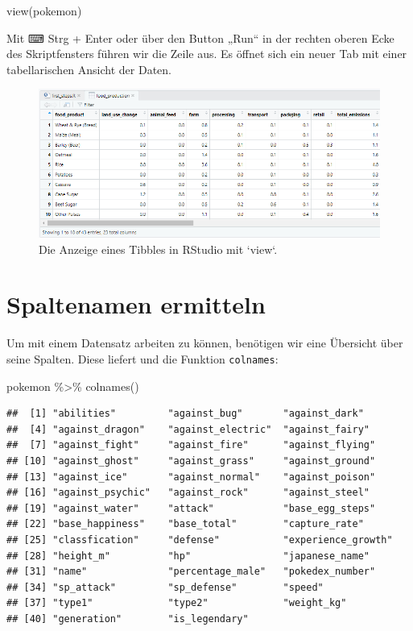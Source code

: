 \documentclass[
]{book}
\newenvironment{Shaded}{\begin{snugshade}}{\end{snugshade}}
\newcommand{\FunctionTok}[1]{\textcolor[rgb]{0.00,0.00,0.00}{#1}}
\newcommand{\NormalTok}[1]{#1}
\newcommand{\SpecialCharTok}[1]{\textcolor[rgb]{0.00,0.00,0.00}{#1}}
\begin{document}
\begin{Shaded}
\begin{Highlighting}[]
\FunctionTok{view}\NormalTok{(pokemon)}
\end{Highlighting}
\end{Shaded}

Mit ⌨ Strg + Enter oder über den Button „Run`` in der rechten oberen Ecke des Skriptfensters führen wir die Zeile aus. Es öffnet sich ein neuer Tab mit einer tabellarischen Ansicht der Daten.

\begin{figure}
\includegraphics[width=1\linewidth]{fig/view_result_rstudio} \caption{Die Anzeige eines Tibbles in RStudio mit `view`.}\label{fig:fig-view-rstudio}
\end{figure}

\hypertarget{spaltennamen-ermitteln}{%
\section{Spaltenamen ermitteln}\label{spaltennamen-ermitteln}}

Um mit einem Datensatz arbeiten zu können, benötigen wir eine Übersicht über seine Spalten. Diese liefert und die Funktion \texttt{colnames}:

\begin{Shaded}
\begin{Highlighting}[]
\NormalTok{pokemon }\SpecialCharTok{\%\textgreater{}\%}
  \FunctionTok{colnames}\NormalTok{()}
\end{Highlighting}
\end{Shaded}

\begin{verbatim}
##  [1] "abilities"         "against_bug"       "against_dark"     
##  [4] "against_dragon"    "against_electric"  "against_fairy"    
##  [7] "against_fight"     "against_fire"      "against_flying"   
## [10] "against_ghost"     "against_grass"     "against_ground"   
## [13] "against_ice"       "against_normal"    "against_poison"   
## [16] "against_psychic"   "against_rock"      "against_steel"    
## [19] "against_water"     "attack"            "base_egg_steps"   
## [22] "base_happiness"    "base_total"        "capture_rate"     
## [25] "classfication"     "defense"           "experience_growth"
## [28] "height_m"          "hp"                "japanese_name"    
## [31] "name"              "percentage_male"   "pokedex_number"   
## [34] "sp_attack"         "sp_defense"        "speed"            
## [37] "type1"             "type2"             "weight_kg"        
## [40] "generation"        "is_legendary"
\end{verbatim}
\end{document}

